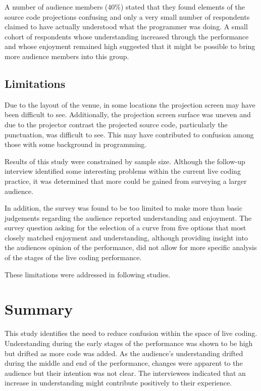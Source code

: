A number of audience members ($40\%$) stated that they found elements of the source code projections confusing and only a very small number of respondents claimed to have actually understood what the programmer was doing. A small cohort of respondents whose understanding increased through the performance and whose enjoyment remained high suggested that it might be possible to bring more audience members into this group.

\subsection{Limitations}

Due to the layout of the venue, in some locations the projection screen may have been difficult to see. Additionally, the projection screen surface was uneven and due to the projector contrast the projected source code, particularly the punctuation, was difficult to see. This may have contributed to confusion among those with some background in programming.

Results of this study were constrained by sample size. Although the follow-up interview identified some interesting problems within the current live coding practice, it was determined that more could be gained from surveying a larger audience.

In addition, the survey was found to be too limited to make more than basic judgements regarding the audience reported understanding and enjoyment. The survey question asking for the selection of a curve from five options that most closely matched enjoyment and understanding, although providing insight into the audiences opinion of the performance, did not allow for more specific analysis of the stages of the live coding performance.

These limitations were addressed in following studies.

\section{Summary}

This study identifies the need to reduce confusion within the space of live coding. Understanding during the early stages of the performance was shown to be high but drifted as more code was added. As the audience's understanding drifted during the middle and end of the performance, changes were apparent to the audience but their intention was not clear. The interviewees indicated that an increase in understanding might contribute positively to their experience.

